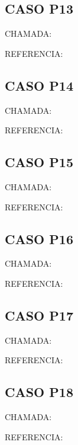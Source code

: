\documentclass{undftex}
\begin{document}
\begin{refsection}\section*{CASO P13}\noindent CHAMADA: \par\noindent REFERENCIA:\par\printbibliography[heading=none]\end{refsection}\clearpage
\begin{refsection}\section*{CASO P14}\noindent CHAMADA: \par\noindent REFERENCIA:\par\printbibliography[heading=none]\end{refsection}\clearpage
\begin{refsection}\section*{CASO P15}\noindent CHAMADA: \par\noindent REFERENCIA:\par\printbibliography[heading=none]\end{refsection}\clearpage
\begin{refsection}\section*{CASO P16}\noindent CHAMADA: \par\noindent REFERENCIA:\par\printbibliography[heading=none]\end{refsection}\clearpage
\begin{refsection}\section*{CASO P17}\noindent CHAMADA: \par\noindent REFERENCIA:\par\printbibliography[heading=none]\end{refsection}\clearpage
\begin{refsection}\section*{CASO P18}\noindent CHAMADA: \par\noindent REFERENCIA:\par\printbibliography[heading=none]\end{refsection}\clearpage
\end{document}
